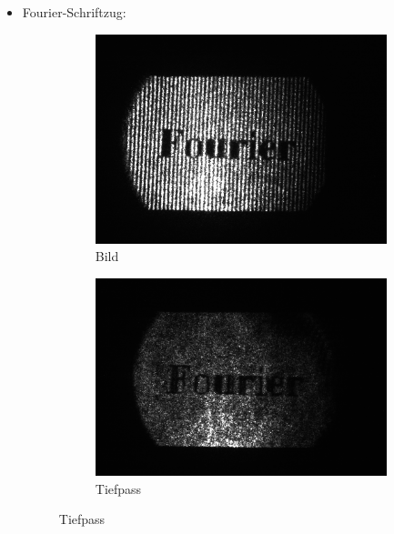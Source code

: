 \documentclass[
	a4paper,
	12pt,
	pagesize,
	ngerman
]{scrartcl}
\begin{document}
\begin{itemize}
	\item{Fourier-Schriftzug:}
		\begin{figure}[H]
	        \centering
	        \begin{subfigure}[b]{0.475\textwidth}
	            \centering
	            \includegraphics[width=\textwidth]{raw/4/4_fourier_gitter}
	            \caption%
	            {Bild}
	            \label{fig_4_fourier_gitter}
	        \end{subfigure}
	        \hfill
	        \begin{subfigure}[b]{0.475\textwidth}
	            \centering
	            \includegraphics[width=\textwidth]{raw/4/4_fourier_tiefpass}
	            \caption[]%
	            {Tiefpass}
	            \label{fig_4_fourier_filter}
	        \end{subfigure}

\end{figure}
\end{itemize}
\end{document}
